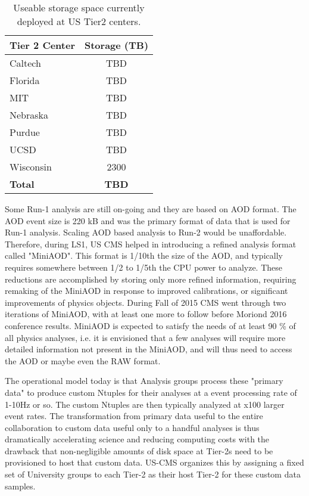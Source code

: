 \documentclass[11pt,a4paper]{article}
\begin{document}
\begin{table}
\begin{center}
\begin{tabular}{|l|c|}
\hline
{\bf Tier 2 Center}                         & {\bf Storage (TB)} \\ \hline
Caltech                                         & TBD \\
Florida                                          & TBD \\
MIT                                               & TBD \\
Nebraska                                      & TBD \\
Purdue                                          & TBD \\
UCSD                                           & TBD \\ 
Wisconsin                                     & 2300 \\ \hline
{\bf Total}                                       & {\bf TBD} \\ \hline
\end{tabular}
\caption[]
{
Useable storage space currently deployed at US Tier2 centers.
}
\label{storage-resources}
\end{center}
\end{table}

Some Run-1 analysis are still on-going and they are based on AOD format.
The AOD event size is 220 kB and was the primary format of data that is
used for Run-1 analysis.  Scaling AOD based analysis to Run-2 
would be unaffordable.  Therefore, during LS1, US CMS helped in introducing
a refined analysis format called "MiniAOD".  This format is 1/10th the size of the AOD, 
and typically requires somewhere between 1/2 to 1/5th the CPU power to
analyze. These reductions are accomplished by storing only more refined information, 
requiring remaking of the MiniAOD in response to improved calibrations, or significant
improvements of physics objects. During Fall of 2015 CMS went through two iterations
of MiniAOD, with at least one more to follow before Moriond 2016 conference results.
MiniAOD is expected to satisfy the needs of at least 90 \% of all physics analyses, i.e. 
it is envisioned that a few analyses will require more detailed information not present 
in the MiniAOD, and will thus need to access the AOD or maybe even the RAW format.

The operational model today is that Analysis groups process these "primary data" to produce custom 
Ntuples for their analyses at a event processing rate of 1-10Hz or so. The custom Ntuples are then typically 
analyzed at x100 larger event rates. The transformation from primary data useful to the entire collaboration to custom data useful
only to a handful analyses is thus dramatically accelerating science and reducing computing costs with the drawback that non-negligible
amounts of disk space at Tier-2s need to be provisioned to host that custom data. US-CMS organizes this by assigning a fixed set of 
University groups to each Tier-2 as their host Tier-2 for these custom data samples.
\end{document}
